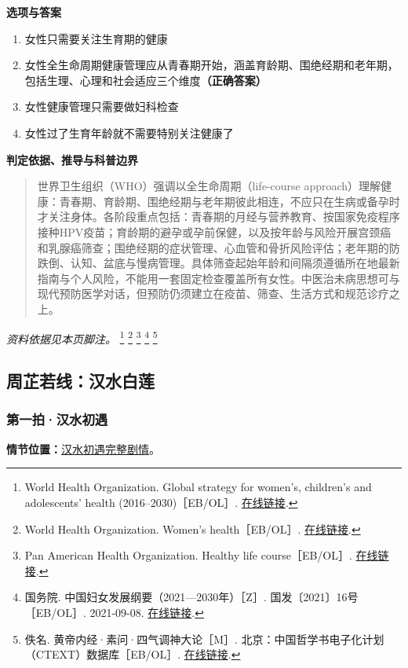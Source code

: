 \textbf{选项与答案}
\begin{enumerate}[label=\Alph*.,leftmargin=*]
  \item 女性只需要关注生育期的健康
  \item 女性全生命周期健康管理应从青春期开始，涵盖育龄期、围绝经期和老年期，包括生理、心理和社会适应三个维度\textbf{（正确答案）}
  \item 女性健康管理只需要做妇科检查
  \item 女性过了生育年龄就不需要特别关注健康了
\end{enumerate}
\textbf{判定依据、推导与科普边界}
\begin{quote}世界卫生组织（WHO）强调以全生命周期（life-course approach）理解健康：青春期、育龄期、围绝经期与老年期彼此相连，不应只在生病或备孕时才关注身体。各阶段重点包括：青春期的月经与营养教育、按国家免疫程序接种HPV疫苗；育龄期的避孕或孕前保健，以及按年龄与风险开展宫颈癌和乳腺癌筛查；围绝经期的症状管理、心血管和骨折风险评估；老年期的防跌倒、认知、盆底与慢病管理。具体筛查起始年龄和间隔须遵循所在地最新指南与个人风险，不能用一套固定检查覆盖所有女性。中医治未病思想可与现代预防医学对话，但预防仍须建立在疫苗、筛查、生活方式和规范诊疗之上。\end{quote}
\noindent\textit{资料依据见本页脚注。}
\footnote{World Health Organization. Global strategy for women’s, children’s and adolescents’ health (2016–2030)［EB/OL］. \href{https://platform.who.int/data/maternal-newborn-child-adolescent-ageing/global-strategy-data}{在线链接}.}
\footnote{World Health Organization. Women’s health［EB/OL］. \href{https://www.who.int/health-topics/women-s-health}{在线链接}.}
\footnote{Pan American Health Organization. Healthy life course［EB/OL］. \href{https://www.paho.org/en/topics/healthy-life-course}{在线链接}.}
\footnote{国务院. 中国妇女发展纲要（2021—2030年）［Z］. 国发〔2021〕16号［EB/OL］. 2021-09-08. \href{https://www.mee.gov.cn/zcwj/gwywj/202109/t20210927_954260.shtml}{在线链接}.}
\footnote{佚名. 黄帝内经·素问·四气调神大论［M］. 北京：中国哲学书电子化计划（CTEXT）数据库［EB/OL］. \href{https://ctext.org/huangdi-neijing/si-qi-diao-shen-da-lun/zh}{在线链接}.}

\subsection{周芷若线：汉水白莲}

\subsubsection{第一拍·汉水初遇}\label{question:zhouzhiruo:1}
\textbf{情节位置：}\hyperref[plot:zhouzhiruo:1]{汉水初遇完整剧情}。

